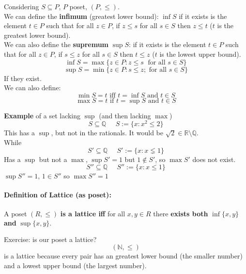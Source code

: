 	Considering $S \subseteq P$, $P$ poset, $(P, \leq)$. \\

	We can define the \textbf{infimum} (greatest lower bound): $\inf S$ if it exists is the element $t \in P$ such that for all $z \in P$, if $z \leq s$ for all $s \in S$ then $z \leq t$ ($t$ is the greatest lower bound).\\

	We can also define the \textbf{supremum} $\sup S$: if it exists is the element $t \in P$ such that for all $z \in P$, if $s \leq z$ for all $s \in S$ then $t \leq z$ ($t$ is the lowest upper bound).\\

	$$ \inf S = \max \{z \in P: z \leq s \;\text{ for all } s \in S\}$$
	$$ \sup S = \min \{z \in P : s \leq z ; \text{ for all } s \in S\}$$
	If they exist.\\

	We can also define:
	$$ \min S = t \text{ iff } t = \inf S \text{ and } t \in S$$
	$$ \max S = t \text{ if } t = \sup S \text{ and } t \in S$$

	\newpage

	\textbf{Example} of a set lacking $\sup$ (and then lacking $\max$)
	$$ S \subseteq \mathbb{Q} \;\;\;\;\; S := \{x : x^2 \leq 2\}$$
	This has a $\sup$, but not in the rationals. It would be $\sqrt{2} \in \mathbb{R} \setminus \mathbb{Q}$.\\

	While
	$$ S' \subseteq \mathbb{Q} \;\;\;\;\; S' := \{x : x \lneq 1\}$$
	Has a $\sup$ but not a $\max$, $\sup S' = 1$ but $1 \notin S'$, so $\max S'$ does not exist.\\

	$$ S'' \subseteq \mathbb{Q} \;\;\;\;\; S'' := \{x : x \leq 1\}$$
	$\sup S'' = 1$, $1 \in S''$ so $\max S'' = 1$

	\paragraph{Definition of Lattice (as poset):} A poset $(R, \leq)$ \textbf{is a lattice iff} for all $x,y \in R$ there \textbf{exists both} $\inf \{x,y\}$ \textbf{and} $\sup\{x,y\}$.\\

	\vfill

	Exercise: is our poset a lattice?
	$$ (\mathbb{N}, \leq) $$
	is a lattice because every pair has an greatest lower bound (the smaller number) and a lowest upper bound (the largest number).

